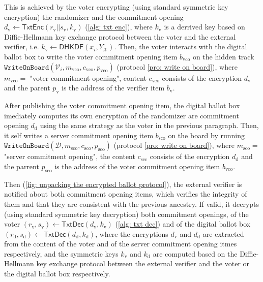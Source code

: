 This is achieved by the voter encrypting (using standard symmetric key encryption) the randomizer and the commitment opening $d_\mathrm{v} \gets \mathsf{TxtEnc}(r_\mathrm{v} || s_\mathrm{v}, k_\mathrm{v})$ (\cref{alg: txt enc}), where $k_\mathrm{v}$ is a derrived key based on Diffie-Hellmann key exchange protocol between the voter and the external verifier, i.e. $k_\mathrm{v} \gets \mathsf{DHKDF}(x_i, Y_\mathcal{X})$. Then, the voter interacts with the digital ballot box to write the voter commitment opening item $b_\mathrm{vco}$ on the hidden track $\mathtt{WriteOnBoard}(\mathcal{V}_i, m_\mathrm{vco}, c_\mathrm{vco}, p_\mathrm{vco})$ (protocol \ref{pro: write on board}), where $m_\mathrm{vco} = $ "voter commitment opening", content $c_\mathrm{vco}$ consists of the encryption $d_\mathrm{v}$ and the parent $p_\mathrm{v}$ is the address of the verifier item $b_\mathrm{v}$.

After publishing the voter commitment opening item, the digital ballot box imediately computes its own encryption of the randomizer are commitment opening $d_\mathrm{d}$ using the same strategy as the voter in the previous paragraph. Then, it self writes a server commitment opening item $b_\mathrm{sco}$ on the board by running $\mathtt{WriteOnBoard}(\mathcal{D}, m_\mathrm{sco}, c_\mathrm{sco}, p_\mathrm{sco})$ (protocol \ref{pro: write on board}), where $m_\mathrm{sco} =$ "server commitment opening", the content $c_\mathrm{sec}$ consists of the encryption $d_\mathrm{d}$ and the parrent $p_\mathrm{sco}$ is the address of the voter commitment opening item $b_\mathrm{vco}$. 

Then (\cref{fig: unpacking the encrypted ballot protocol}), the external verifier is notified about both commitment opening items, which verifies the integrity of them and that they are consistent with the previous ancestry. If valid, it decrypts (using standard symmetric key decryption) both commitment openings, of the voter $(r_\mathrm{v}, s_\mathrm{v}) \gets \mathsf{TxtDec}(d_\mathrm{v}, k_\mathrm{v})$ (\cref{alg: txt dec}) and of the digital ballot box $(r_\mathrm{d}, s_\mathrm{d}) \gets \mathsf{TxtDec}(d_\mathrm{d}, k_\mathrm{d})$, where the encryptions $d_\mathrm{v}$ and $d_\mathrm{d}$ are extracted from the content of the voter and of the server commitment opening itmes respectively, and the symmetric keys $k_\mathrm{v}$ and $k_\mathrm{d}$ are computed based on the Diffie-Hellmann key exchange protocol between the external verifier and the voter or the digital ballot box respectively.


